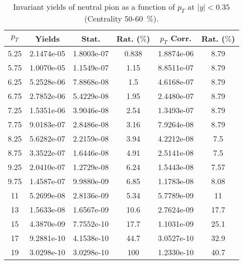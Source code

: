             
\begin{table}[!htb]
\centering
\begin{tabular}{|c|c|c|c|c|c|}
\hline
$p_{T}$ & Yields & Stat. & Rat. ($\%$) & $p_{T}$ Corr. & Rat. ($\%$) \\
\hline
5.25 & 2.1474e-05 & 1.8003e-07 & 0.838 & 1.8874e-06 & 8.79 \\ 
5.75 & 1.0070e-05 & 1.1549e-07 & 1.15 & 8.8511e-07 & 8.79 \\ 
6.25 & 5.2528e-06 & 7.8868e-08 & 1.5 & 4.6168e-07 & 8.79 \\ 
6.75 & 2.7852e-06 & 5.4229e-08 & 1.95 & 2.4480e-07 & 8.79 \\ 
7.25 & 1.5351e-06 & 3.9046e-08 & 2.54 & 1.3493e-07 & 8.79 \\ 
7.75 & 9.0183e-07 & 2.8486e-08 & 3.16 & 7.9264e-08 & 8.79 \\ 
8.25 & 5.6282e-07 & 2.2159e-08 & 3.94 & 4.2212e-08 & 7.5 \\ 
8.75 & 3.3522e-07 & 1.6446e-08 & 4.91 & 2.5141e-08 & 7.5 \\ 
9.25 & 2.0410e-07 & 1.2729e-08 & 6.24 & 1.5443e-08 & 7.57 \\ 
9.75 & 1.4587e-07 & 9.9880e-09 & 6.85 & 1.1783e-08 & 8.08 \\ 
11 & 5.2699e-08 & 2.8136e-09 & 5.34 & 5.7789e-09 & 11 \\ 
13 & 1.5633e-08 & 1.6567e-09 & 10.6 & 2.7624e-09 & 17.7 \\ 
15 & 4.3870e-09 & 7.7552e-10 & 17.7 & 1.1031e-09 & 25.1 \\ 
17 & 9.2881e-10 & 4.1538e-10 & 44.7 & 3.0527e-10 & 32.9 \\ 
19 & 3.0298e-10 & 3.0298e-10 & 100 & 1.2330e-10 & 40.7 \\ 
\hline
\end{tabular}
\caption{Invariant yields of neutral pion as a function of $p_{T}$ at $|y|<0.35$ (Centrality 50-60~$\%$).}
\end{table}
            
